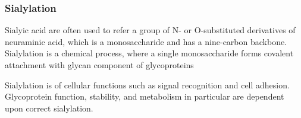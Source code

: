 \subsubsection {Sialylation}
Sialyic acid are often used to refer a group of N- or O-substituted derivatives of neuraminic acid, which is a monosaccharide and has a nine-carbon backbone.~\cite{Vocadlo_2009} Sialylation is a chemical process, where a single monosaccharide forms covalent attachment with glycan component of glycoproteins

Sialylation is  of cellular functions such as signal recognition and cell adhesion. Glycoprotein function, stability, and metabolism in particular are dependent upon correct sialylation.